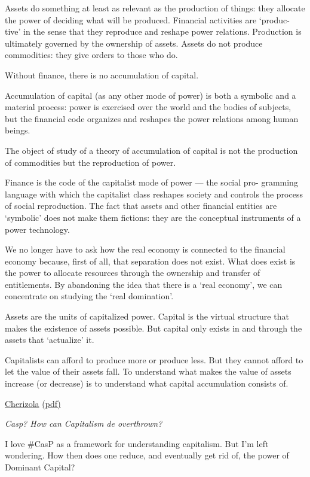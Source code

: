 \documentclass[
]{book}
\begin{document}
Assets do something at least as relevant as the production of things: they allocate
the power of deciding what will be produced. Financial activities are `produc-
tive' in the sense that they reproduce and reshape power relations.
Production is ultimately governed by the ownership of assets.
Assets do not produce commodities: they give orders to those who do.

Without finance, there is no accumulation of capital.

Accumulation of capital (as any other mode of power) is both a symbolic
and a material process: power is exercised over the world and the bodies of
subjects, but the financial code organizes and reshapes the power relations
among human beings.

The object of study of a theory of accumulation of capital is not the
production of commodities but the reproduction of power.

Finance is the code of the capitalist mode of power --- the social pro-
gramming language with which the capitalist class reshapes society and
controls the process of social reproduction. The fact that assets and other
financial entities are `symbolic' does not make them fictions: they are
the conceptual instruments of a power technology.

We no longer have to ask
how the real economy is connected to the financial economy because,
first of all, that separation does not exist. What does exist is the power
to allocate resources through the ownership and transfer of entitlements.
By abandoning the idea that there is a `real economy', we can concentrate
on studying the `real domination'.

Assets are the units of capitalized power. Capital is the virtual structure
that makes the existence of assets possible. But capital only exists in and
through the assets that `actualize' it.

Capitalists can afford to produce more or produce less. But they cannot
afford to let the value of their assets fall. To understand what makes
the value of assets increase (or decrease) is to understand what capital
accumulation consists of.

\href{https://capitalaspower.com/2021/05/cherizola-from-commodities-to-assets/}{Cherizola}
\href{pdf/Cherizola_2021_Commodities_Assets.pdf}{(pdf)}

\emph{Casp? How can Capitalism de overthrown?}

I love \#CasP as a framework for understanding capitalism.
But I'm left wondering. How then does one reduce, and eventually get rid of, the power of Dominant Capital?
\end{document}
